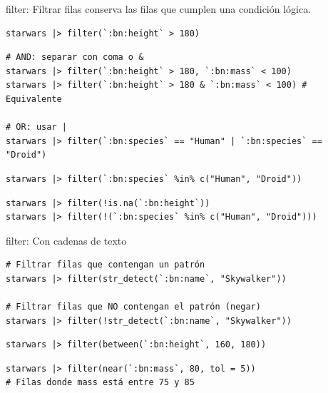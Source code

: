 \documentclass[8pt]{beamer}
\begin{document}
\begin{frame}[fragile]{filter: Filtrar filas}
	 conserva las filas que cumplen una condición lógica.
\begin{lstlisting}[style=RScript]
starwars |> filter(`:bn:height` > 180)
\end{lstlisting}

\begin{lstlisting}[style=RScript]
# AND: separar con coma o &
starwars |> filter(`:bn:height` > 180, `:bn:mass` < 100)
starwars |> filter(`:bn:height` > 180 & `:bn:mass` < 100) # Equivalente

# OR: usar |
starwars |> filter(`:bn:species` == "Human" | `:bn:species` == "Droid")
\end{lstlisting}

\begin{lstlisting}[style=RScript]
starwars |> filter(`:bn:species` %in% c("Human", "Droid"))
\end{lstlisting}

\begin{lstlisting}[style=RScript]
starwars |> filter(!is.na(`:bn:height`))
starwars |> filter(!(`:bn:species` %in% c("Human", "Droid")))
\end{lstlisting}
\end{frame}




\begin{frame}[fragile]{filter: Con cadenas de texto}
\begin{lstlisting}[style=RScript]
# Filtrar filas que contengan un patrón
starwars |> filter(str_detect(`:bn:name`, "Skywalker"))

# Filtrar filas que NO contengan el patrón (negar)
starwars |> filter(!str_detect(`:bn:name`, "Skywalker"))
\end{lstlisting}

\begin{lstlisting}[style=RScript]
starwars |> filter(between(`:bn:height`, 160, 180))
\end{lstlisting}

\begin{lstlisting}[style=RScript]
starwars |> filter(near(`:bn:mass`, 80, tol = 5))
# Filas donde mass está entre 75 y 85
\end{lstlisting}
\end{frame}
\end{document}
